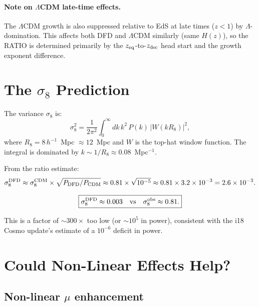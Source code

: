 \documentclass[aps,prd,twocolumn,nofootinbib]{revtex4-2}
\newcommand{\ee}[1]{\times 10^{#1}}
\newcommand{\LCDM}{$\Lambda$CDM}
\begin{document}
\paragraph{Note on $\Lambda$CDM late-time effects.}
The \LCDM{} growth is also suppressed relative to EdS at late times
($z < 1$) by $\Lambda$-domination. This affects both DFD and \LCDM{}
similarly (same $H(z)$), so the RATIO is determined primarily by the
$z_{\rm eq}$-to-$z_{\rm dec}$ head start and the growth exponent
difference.


\section{The $\sigma_8$ Prediction}
\label{sec:sigma8}

The variance $\sigma_8$ is:
\begin{equation}
\sigma_8^2 = \frac{1}{2\pi^2}\int_0^\infty dk\,k^2\,P(k)\,
|W(kR_8)|^2,
\end{equation}
where $R_8 = 8\,h^{-1}$~Mpc $\approx 12$~Mpc and $W$ is the
top-hat window function. The integral is dominated by
$k \sim 1/R_8 \approx 0.08$~Mpc$^{-1}$.

From the ratio estimate:
\begin{equation}
\sigma_8^{\rm DFD} \approx \sigma_8^{\rm CDM}
\times \sqrt{P_{\rm DFD}/P_{\rm CDM}}
\approx 0.81 \times \sqrt{10^{-5}}
\approx 0.81 \times 3.2\ee{-3}
= 2.6\ee{-3}.
\end{equation}

\begin{equation}
\boxed{\sigma_8^{\rm DFD} \approx 0.003
\quad\text{vs}\quad \sigma_8^{\rm obs} \approx 0.81.}
\end{equation}

This is a factor of $\sim 300\times$ too low (or $\sim 10^5$ in
power), consistent with the i18 Cosmo update's estimate of a
$10^{-6}$ deficit in power.

\section{Could Non-Linear Effects Help?}
\label{sec:nonlinear}

\subsection{Non-linear $\mu$ enhancement}
\end{document}

